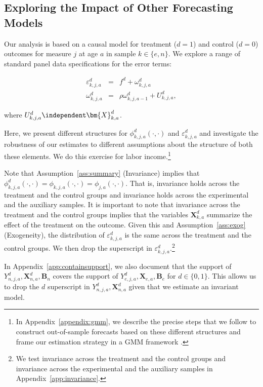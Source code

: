 \subsection{Exploring the Impact of Other Forecasting Models} \label{appendix:predsensitivity}

Our analysis is based on a causal model for treatment ($d=1$) and control ($d=0$) outcomes for measure $j$ at age $a$ in sample $k \in \{e,n\}$. We explore a range of standard panel data specifications for the error terms:

\begin{eqnarray}
\varepsilon^d_{k,j,a} &=& f^d + \omega^d_{k,j,a} \nonumber \\
\omega^d_{k,j,a}      &=& \rho \omega^d_{k,j,a-1} + U^d_{k,j,a},
\end{eqnarray}

\noindent where $U^d_{k,j,a} \independent \bm{X}^d_{k,a}$.

Here, we present different structures for $\phi_{k,j,a}^d \left( \cdot, \cdot \right)$ and $\varepsilon_{k,j,a}^d$ and investigate the robustness of our estimates to different assumptions about the structure of both these elements. We do this exercise for labor income.\footnote{In Appendix~\ref{appendix:gmm}, we describe the precise steps that we follow to construct out-of-sample forecasts based on these different structures and frame our estimation strategy in a GMM framework \citep{Hansen_1982_Econometrica}.}

Note that Assumption~\ref{ass:summary} (Invariance) implies that $\phi_{k,j,a}^d \left (\cdot, \cdot \right) = \phi_{k,j,a}  \left (\cdot, \cdot \right) = \phi_{j,a}  \left (\cdot, \cdot \right)$. That is, invariance holds across the treatment and the control groups and invariance holds across the experimental and the auxiliary samples. It is important to note that invariance across the treatment and the control groups implies that the variables $\bm{X}_{k,a}^d$ summarize the effect of the treatment on the outcome. Given this and Assumption~\ref{ass:exog} (Exogeneity), the distribution of $\varepsilon_{k,j,a}^d$ is the same across the treatment and the control groups. We then drop the superscript in $\varepsilon_{k,j,a}^d$.\footnote{We test invariance across the treatment and the control groups and invariance across the experimental and the auxiliary samples  in Appendix~\ref{app:invariance}.}

In Appendix~\ref{app:containsupport}, we also document that the support of $Y_{n,j,a}^d, \bm{X}_{n,a}^d, \bm{B}_{n}$ covers the support of $Y_{e,j,a}^d, \bm{X}_{e,a}, \bm{B}_{e}$ for $d \in \{0, 1\}$. This allows us to drop the $d$ superscript in $Y_{n,j,a}^d, \bm{X}_{n,a}^d$ given that we estimate an invariant model.

